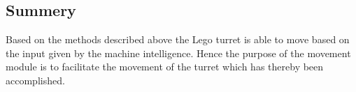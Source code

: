 \subsection{Summery}
Based on the methods described above the Lego turret is able to move based on the input given by the machine intelligence. 
Hence the purpose of the movement module is to facilitate the movement of the turret which has thereby been accomplished. 


































